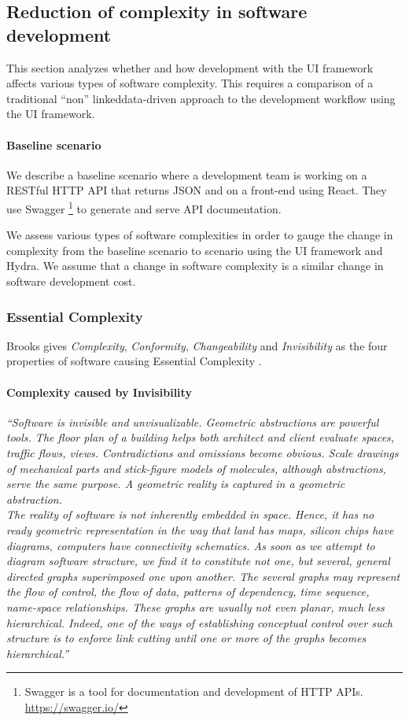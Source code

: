 \subsection{Reduction of complexity in software development}
This section analyzes whether and how development with the UI framework affects various types of software complexity. This requires a comparison of a traditional ``non'' \gls{linkeddata}-driven approach to the development workflow using the UI framework.

\paragraph{Baseline scenario} We describe a baseline scenario where a development team is working on a RESTful HTTP API that returns JSON and on a front-end using React. They use Swagger \footnote{Swagger is a tool for documentation and development of HTTP APIs. \url{https://swagger.io/}} to generate and serve API documentation.

We assess various types of software complexities in order to gauge the change in complexity from the baseline scenario to scenario using the UI framework and Hydra. We assume that a change in software complexity is a similar change in software development cost.

\subsubsection{Essential Complexity}
Brooks gives \textit{Complexity}, \textit{Conformity}, \textit{Changeability} and \textit{Invisibility} as the four properties of software causing Essential Complexity \citep{nosilverbullet}.

\paragraph{Complexity caused by Invisibility}
\textit{``Software is invisible and unvisualizable. Geometric abstractions are powerful tools. The floor plan of a building helps both architect and client evaluate spaces, traffic flows, views. Contradictions and omissions become obvious. Scale drawings of mechanical parts and stick-figure models of molecules, although abstractions, serve the same purpose. A geometric reality is captured in a geometric abstraction. \\ The reality of software is not inherently embedded in space. Hence, it has no ready geometric representation in the way that land has maps, silicon chips have diagrams, computers have connectivity schematics. As soon as we attempt to diagram software structure, we find it to constitute not one, but several, general directed graphs superimposed one upon another. The several graphs may represent the flow of control, the flow of data, patterns of dependency, time sequence, name-space relationships. These graphs are usually not even planar, much less hierarchical. Indeed, one of the ways of establishing conceptual control over such structure is to enforce link cutting until one or more of the graphs becomes hierarchical.''} \citep[p.~4]{nosilverbullet}

